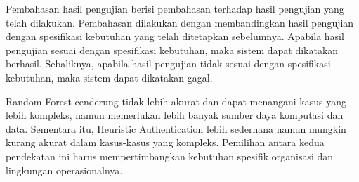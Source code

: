 Pembahasan hasil pengujian berisi pembahasan terhadap hasil pengujian yang telah dilakukan. Pembahasan dilakukan dengan membandingkan hasil pengujian dengan spesifikasi kebutuhan yang telah ditetapkan sebelumnya. Apabila hasil pengujian sesuai dengan spesifikasi kebutuhan, maka sistem dapat dikatakan berhasil. Sebaliknya, apabila hasil pengujian tidak sesuai dengan spesifikasi kebutuhan, maka sistem dapat dikatakan gagal.

Random Forest cenderung tidak lebih akurat dan dapat menangani kasus yang lebih kompleks, namun memerlukan lebih banyak sumber daya komputasi dan data. Sementara itu, Heuristic Authentication lebih sederhana namun mungkin kurang akurat dalam kasus-kasus yang kompleks. Pemilihan antara kedua pendekatan ini harus mempertimbangkan kebutuhan spesifik organisasi dan lingkungan operasionalnya.
